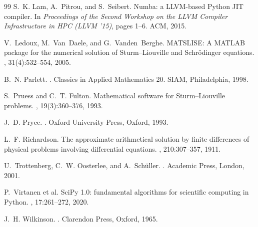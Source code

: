 \documentclass[twocolumn,10pt,a4paper]{article}
\theoremstyle{plain}
\theoremstyle{definition}
\begin{document}
\begin{thebibliography}{99}
S.~K. Lam, A.~Pitrou, and S.~Seibert.
\newblock Numba: a LLVM-based Python JIT compiler.
\newblock In {\em Proceedings of the Second Workshop on the LLVM Compiler
Infrastructure in HPC (LLVM '15)}, pages 1--6. ACM, 2015.

V.~Ledoux, M.~Van~Daele, and G.~Vanden~Berghe.
\newblock MATSLISE: A MATLAB package for the numerical solution of
Sturm--Liouville and Schr\"odinger equations.
, 31(4):532--554, 2005.

B.~N. Parlett.
.
\newblock Classics in Applied Mathematics 20. SIAM, Philadelphia, 1998.

S.~Pruess and C.~T. Fulton.
\newblock Mathematical software for Sturm--Liouville problems.
, 19(3):360--376, 1993.

J.~D. Pryce.
.
\newblock Oxford University Press, Oxford, 1993.

L.~F. Richardson.
\newblock The approximate arithmetical solution by finite differences of
physical problems involving differential equations.
,
210:307--357, 1911.

U.~Trottenberg, C.~W. Oosterlee, and A.~Sch\"uller.
.
\newblock Academic Press, London, 2001.

P.~Virtanen et al.
\newblock SciPy 1.0: fundamental algorithms for scientific computing in Python.
, 17:261--272, 2020.

J.~H. Wilkinson.
.
\newblock Clarendon Press, Oxford, 1965.

\end{thebibliography}
\end{document}
